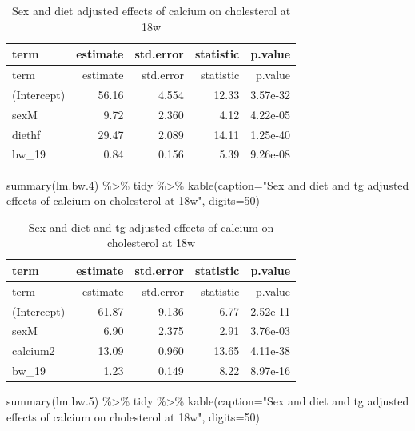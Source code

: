 \documentclass[
]{article}
\newenvironment{Shaded}{\begin{snugshade}}{\end{snugshade}}
\newcommand{\AttributeTok}[1]{\textcolor[rgb]{0.77,0.63,0.00}{#1}}
\newcommand{\DecValTok}[1]{\textcolor[rgb]{0.00,0.00,0.81}{#1}}
\newcommand{\FloatTok}[1]{\textcolor[rgb]{0.00,0.00,0.81}{#1}}
\newcommand{\FunctionTok}[1]{\textcolor[rgb]{0.00,0.00,0.00}{#1}}
\newcommand{\NormalTok}[1]{#1}
\newcommand{\SpecialCharTok}[1]{\textcolor[rgb]{0.00,0.00,0.00}{#1}}
\newcommand{\StringTok}[1]{\textcolor[rgb]{0.31,0.60,0.02}{#1}}
\begin{document}
\begin{longtable}[]{@{}lrrrr@{}}
\caption{Sex and diet adjusted effects of calcium on cholesterol at
18w}\tabularnewline
\toprule()
term & estimate & std.error & statistic & p.value \\
\midrule()
\endfirsthead
\toprule()
term & estimate & std.error & statistic & p.value \\
\midrule()
\endhead
(Intercept) & 56.16 & 4.554 & 12.33 & 3.57e-32 \\
sexM & 9.72 & 2.360 & 4.12 & 4.22e-05 \\
diethf & 29.47 & 2.089 & 14.11 & 1.25e-40 \\
bw\_19 & 0.84 & 0.156 & 5.39 & 9.26e-08 \\
\bottomrule()
\end{longtable}

\begin{Shaded}
\begin{Highlighting}[]
\FunctionTok{summary}\NormalTok{(lm.bw}\FloatTok{.4}\NormalTok{) }\SpecialCharTok{\%\textgreater{}\%}\NormalTok{ tidy }\SpecialCharTok{\%\textgreater{}\%} \FunctionTok{kable}\NormalTok{(}\AttributeTok{caption=}\StringTok{"Sex and diet and tg adjusted effects of calcium on cholesterol at 18w"}\NormalTok{, }\AttributeTok{digits=}\DecValTok{50}\NormalTok{)}
\end{Highlighting}
\end{Shaded}

\begin{longtable}[]{@{}lrrrr@{}}
\caption{Sex and diet and tg adjusted effects of calcium on cholesterol
at 18w}\tabularnewline
\toprule()
term & estimate & std.error & statistic & p.value \\
\midrule()
\endfirsthead
\toprule()
term & estimate & std.error & statistic & p.value \\
\midrule()
\endhead
(Intercept) & -61.87 & 9.136 & -6.77 & 2.52e-11 \\
sexM & 6.90 & 2.375 & 2.91 & 3.76e-03 \\
calcium2 & 13.09 & 0.960 & 13.65 & 4.11e-38 \\
bw\_19 & 1.23 & 0.149 & 8.22 & 8.97e-16 \\
\bottomrule()
\end{longtable}

\begin{Shaded}
\begin{Highlighting}[]
\FunctionTok{summary}\NormalTok{(lm.bw}\FloatTok{.5}\NormalTok{) }\SpecialCharTok{\%\textgreater{}\%}\NormalTok{ tidy }\SpecialCharTok{\%\textgreater{}\%} \FunctionTok{kable}\NormalTok{(}\AttributeTok{caption=}\StringTok{"Sex and diet and tg adjusted effects of calcium on cholesterol at 18w"}\NormalTok{, }\AttributeTok{digits=}\DecValTok{50}\NormalTok{)}
\end{Highlighting}
\end{Shaded}
\end{document}
